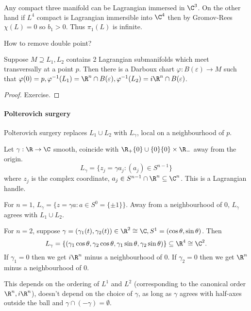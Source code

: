 \documentclass[a4paper]{article}
\begin{document}
\begin{remark}
  Any compact three manifold can be Lagrangian immersed in \(\C^3\). On the other hand if \(L^4\) compact is Lagrangian immersible into \(\C^4\) then by Gromov-Rees \(\chi(L) = 0\) so \(b_1 > 0\). Thus \(\pi_1(L)\) is infinite.
\end{remark}

How to remove double point?

\begin{proposition}
  Suppose \(M \supseteq L_1, L_2\) contains 2 Lagrangian submanifolds which meet transversally at a point \(p\). Then there is a Darboux chart \(\varphi: B(\varepsilon) \to M\) such that \(\varphi(0) = p, \varphi^{-1}(L_1) = \R^n \cap B(\varepsilon), \varphi^{-1}(L_2) = i \R^n \cap B(\varepsilon)\).
\end{proposition}

\begin{proof}
  Exercise.
\end{proof}

\paragraph{Polterovich surgery}

Polterovich surgery replaces \(L_1 \cup L_2\) with \(L_\gamma\), local on a neighbourhood of \(p\).

Let \(\gamma: \R \to \C\) smooth, coincide with \(\R_+ \{0\} \cup \{0\} \{0\} \times \R_-\) away from the origin.
\[
  L_\gamma = \{z_j = \gamma a_j: (a_j) \in S^{n - 1}\}
\]
where \(z_j\) is the complex coordinate, \(a_j \in S^{n - 1} \cap \R^n \subseteq \C^n\). This is a Lagrangian handle.

\begin{eg}
  
For \(n = 1\), \(L_\gamma = \{z = \gamma a: a\in S^0 = \{\pm 1\}\}\). Away from a neighbourhood of \(0\), \(L_\gamma\) agrees with \(L_1 \cup L_2\).

For \(n = 2\), suppose \(\gamma = (\gamma_1(t), \gamma_2(t)) \in \R^2 \cong \C, S^1 = (\cos \theta, \sin \theta)\). Then
\[
  L_\gamma = \{(\gamma_1 \cos \theta, \gamma_2 \cos \theta, \gamma_1 \sin \theta, \gamma_2 \sin \theta)\} \subseteq \R^4 \cong \C^2.
\]
If \(\gamma_1 = 0\) then we get \(i\R^n\) minus a neighbourhood of \(0\). If \(\gamma_2 = 0\) then we get \(\R^n\) minus a neighbourhood of \(0\).
\end{eg}

This depends on the ordering of \(L^1\) and \(L^2\) (corresponding to the canonical order \(\R^n, i\R^n\)), doesn't depend on the choice of \(\gamma\), as long as \(\gamma\) agrees with half-axes outside the ball and \(\gamma \cap (-\gamma) = \emptyset\).
\end{document}
